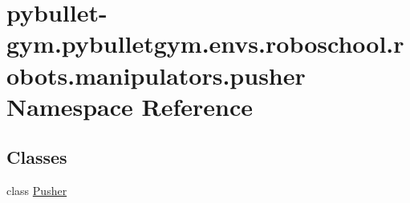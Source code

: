 \hypertarget{namespacepybullet-gym_1_1pybulletgym_1_1envs_1_1roboschool_1_1robots_1_1manipulators_1_1pusher}{}\section{pybullet-\/gym.pybulletgym.\+envs.\+roboschool.\+robots.\+manipulators.\+pusher Namespace Reference}
\label{namespacepybullet-gym_1_1pybulletgym_1_1envs_1_1roboschool_1_1robots_1_1manipulators_1_1pusher}
\subsection*{Classes}
\begin{DoxyCompactItemize}
\item 
class \hyperlink{classpybullet-gym_1_1pybulletgym_1_1envs_1_1roboschool_1_1robots_1_1manipulators_1_1pusher_1_1_pusher}{Pusher}
\end{DoxyCompactItemize}
